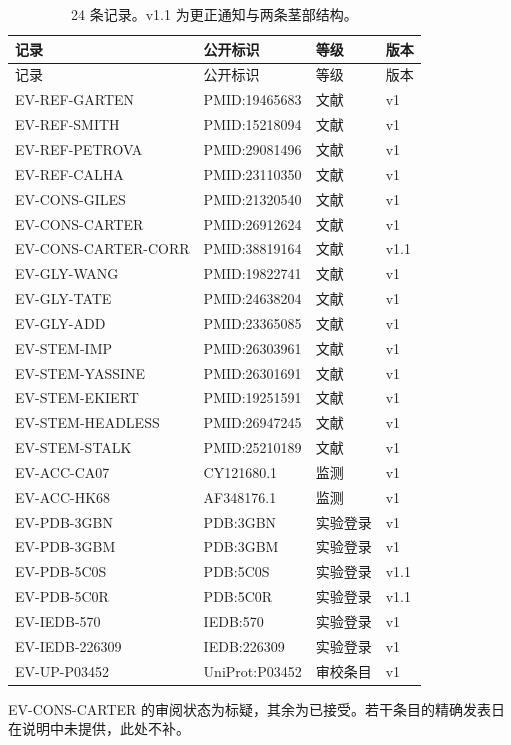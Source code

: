 \begin{longtable}{p{3.5cm}p{3.6cm}p{3.2cm}p{2.2cm}}
\caption{24 条记录。v1.1 为更正通知与两条茎部结构。}\label{tab:recs}\\
\toprule
记录 & 公开标识 & 等级 & 版本 \\
\midrule
\endfirsthead
\toprule
记录 & 公开标识 & 等级 & 版本 \\
\midrule
\endhead
EV-REF-GARTEN & PMID:19465683 & 文献 & v1 \\
EV-REF-SMITH & PMID:15218094 & 文献 & v1 \\
EV-REF-PETROVA & PMID:29081496 & 文献 & v1 \\
EV-REF-CALHA & PMID:23110350 & 文献 & v1 \\
EV-CONS-GILES & PMID:21320540 & 文献 & v1 \\
EV-CONS-CARTER & PMID:26912624 & 文献 & v1 \\
EV-CONS-CARTER-CORR & PMID:38819164 & 文献 & v1.1 \\
EV-GLY-WANG & PMID:19822741 & 文献 & v1 \\
EV-GLY-TATE & PMID:24638204 & 文献 & v1 \\
EV-GLY-ADD & PMID:23365085 & 文献 & v1 \\
EV-STEM-IMP & PMID:26303961 & 文献 & v1 \\
EV-STEM-YASSINE & PMID:26301691 & 文献 & v1 \\
EV-STEM-EKIERT & PMID:19251591 & 文献 & v1 \\
EV-STEM-HEADLESS & PMID:26947245 & 文献 & v1 \\
EV-STEM-STALK & PMID:25210189 & 文献 & v1 \\
EV-ACC-CA07 & CY121680.1 & 监测 & v1 \\
EV-ACC-HK68 & AF348176.1 & 监测 & v1 \\
EV-PDB-3GBN & PDB:3GBN & 实验登录 & v1 \\
EV-PDB-3GBM & PDB:3GBM & 实验登录 & v1 \\
EV-PDB-5C0S & PDB:5C0S & 实验登录 & v1.1 \\
EV-PDB-5C0R & PDB:5C0R & 实验登录 & v1.1 \\
EV-IEDB-570 & IEDB:570 & 实验登录 & v1 \\
EV-IEDB-226309 & IEDB:226309 & 实验登录 & v1 \\
EV-UP-P03452 & UniProt:P03452 & 审校条目 & v1 \\
\bottomrule
\end{longtable}

EV-CONS-CARTER 的审阅状态为标疑，其余为已接受。若干条目的精确发表日在说明中未提供，此处不补。

